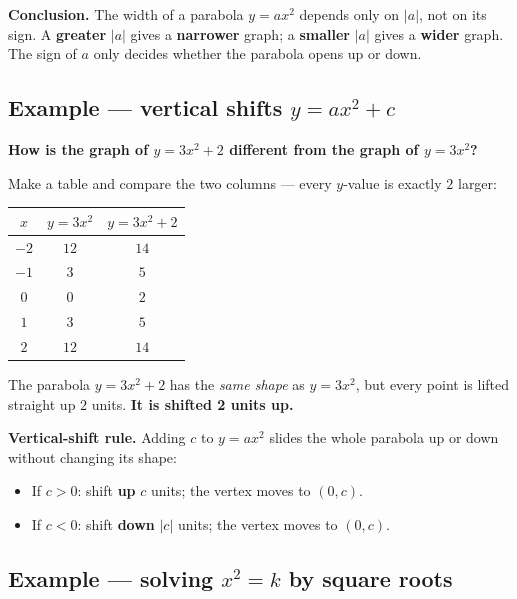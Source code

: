 \documentclass[11pt]{article}
\begin{document}
\begin{keybox}
\textbf{Conclusion.} The width of a parabola $y=ax^2$ depends only on $|a|$, not on its sign.
A \textbf{greater} $|a|$ gives a \textbf{narrower} graph; a \textbf{smaller} $|a|$
gives a \textbf{wider} graph. The sign of $a$ only decides whether the parabola opens up or down.
\end{keybox}

\subsection{Example --- vertical shifts $y = ax^2 + c$}

\textbf{How is the graph of $y = 3x^2 + 2$ different from the graph of $y = 3x^2$?}

Make a table and compare the two columns --- every $y$-value is exactly $2$ larger:

\begin{center}
\renewcommand{\arraystretch}{1.2}
\begin{tabular}{c|c|c}
$x$ & $y = 3x^2$ & $y = 3x^2 + 2$ \\ \hline
$-2$ & $12$ & $14$ \\
$-1$ & $3$  & $5$  \\
$0$  & $0$  & $2$  \\
$1$  & $3$  & $5$  \\
$2$  & $12$ & $14$
\end{tabular}
\end{center}

The parabola $y = 3x^2 + 2$ has the \emph{same shape} as $y = 3x^2$, but every point is lifted
straight up $2$ units. \textbf{It is shifted 2 units up.}

\begin{keybox}
\textbf{Vertical-shift rule.} Adding $c$ to $y = ax^2$ slides the whole parabola up or down
without changing its shape:
\begin{itemize}[nosep,leftmargin=1.4em]
\item If $c > 0$: shift \textbf{up} $c$ units; the vertex moves to $(0,c)$.
\item If $c < 0$: shift \textbf{down} $|c|$ units; the vertex moves to $(0,c)$.
\end{itemize}
\end{keybox}

\subsection{Example --- solving $x^2 = k$ by square roots}
\end{document}
